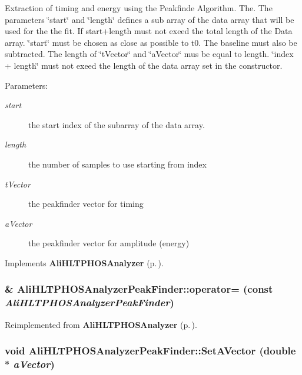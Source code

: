 Extraction of timing and energy using the Peakfinde Algorithm. The. The parameters \char`\"{}start\char`\"{} and \char`\"{}length\char`\"{} defines a sub array of the data array that will be used for the the fit. If start+length must not exeed the total length of the Data array. \char`\"{}start\char`\"{} must be chosen as close as possible to t0. The baseline must also be subtracted. The length of \char`\"{}t\-Vector\char`\"{} and \char`\"{}a\-Vector\char`\"{} mus be equal to length. \char`\"{}index + length\char`\"{} must not exeed the length of the data array set in the constructor. \begin{Desc}
\item[Parameters:]
\begin{description}
\item[{\em start}]the start index of the subarray of the data array. \item[{\em length}]the number of samples to use starting from index \item[{\em t\-Vector}]the peakfinder vector for timing \item[{\em a\-Vector}]the peakfinder vector for amplitude (energy) \end{description}
\end{Desc}


Implements {\bf Ali\-HLTPHOSAnalyzer} {\rm (p.\,\pageref{classAliHLTPHOSAnalyzer_a14})}.
\subsubsection{\& Ali\-HLTPHOSAnalyzer\-Peak\-Finder::operator= (const  {\em Ali\-HLTPHOSAnalyzer\-Peak\-Finder})\hspace{0.3cm}{\tt  [inline]}}\label{classAliHLTPHOSAnalyzerPeakFinder_a2}




Reimplemented from {\bf Ali\-HLTPHOSAnalyzer} {\rm (p.\,\pageref{classAliHLTPHOSAnalyzer_a4})}.
\subsubsection{\setlength{\rightskip}{0pt plus 5cm}void Ali\-HLTPHOSAnalyzer\-Peak\-Finder::Set\-AVector (double $\ast$ {\em a\-Vector})}\label{classAliHLTPHOSAnalyzerPeakFinder_a5}



